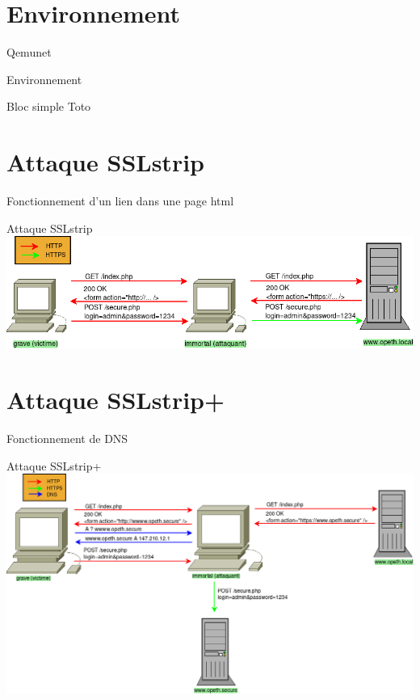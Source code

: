 \documentclass{beamer}
\begin{document}
\section{Environnement}

\begin{frame}{Qemunet}
\end{frame}

\begin{frame}{Environnement}
    \begin{block}{Bloc simple}
        Toto
    \end{block}
\end{frame}

\section{Attaque SSLstrip}

\begin{frame}{Fonctionnement d'un lien dans une page html}

\end{frame}

\begin{frame}{Attaque SSLstrip}
    \includegraphics[scale=0.4]{../medias/sslstrip/attack.png}
\end{frame}

\section{Attaque SSLstrip+}

\begin{frame}{Fonctionnement de DNS}
\end{frame}

\begin{frame}{Attaque SSLstrip+}
    \includegraphics[scale=0.32]{../medias/sslstrip2/attack.png}
\end{frame}
\end{document}
